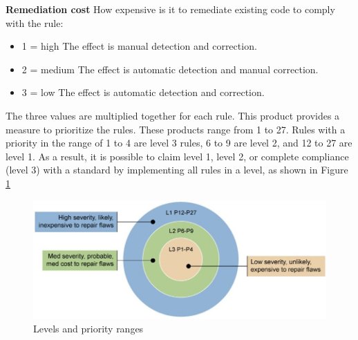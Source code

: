 \textbf{Remediation cost} How expensive is it to remediate existing code to comply with the rule:
\begin{itemize}
\item 1 = high
The effect is manual detection and correction.
\item 2 = medium
The effect is automatic detection and manual correction.
\item 3 = low
The effect is automatic detection and correction.
\end{itemize}
The three values are multiplied together for each rule. This product provides a measure to prioritize the rules. These products range from 1 to 27. Rules with a priority in the range of 1 to 4 are level 3 rules, 6 to 9 are level 2, and 12 to 27
are level 1. As a result, it is possible to claim level 1, level 2, or complete compliance (level 3)
with a standard by implementing all rules in a level, as shown in Figure \ref{fig:1}\cite{cert-c}
	\begin{figure}[H]
		
		
		\centering
		\includegraphics[width=.9\linewidth]{Figures/lev}
		\caption{Levels and priority ranges}	 
		\label{fig:1}
		
	\end{figure}
	 

